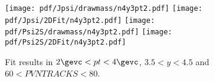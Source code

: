 \begin{figure}[H]
\begin{center}
\texttt{[image: pdf/Jpsi/drawmass/n4y3pt2.pdf]}
\texttt{[image: pdf/Jpsi/2DFit/n4y3pt2.pdf]}
\vspace*{-0.5cm}
\texttt{[image: pdf/Psi2S/drawmass/n4y3pt2.pdf]}
\texttt{[image: pdf/Psi2S/2DFit/n4y3pt2.pdf]}
\vspace*{-0.5cm}
\end{center}
\caption{Fit results in $2\gevc<pt<4\gevc$, $3.5<y<4.5$ and $60<PVNTRACKS<80$.}
\label{Fitn4y3pt2}
\end{figure}
